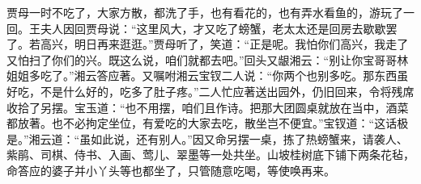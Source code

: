 \begin{parag}


    贾母一时不吃了，大家方散，都洗了手，也有看花的，也有弄水看鱼的，游玩了一回。王夫人因回贾母说：“这里风大，才又吃了螃蟹，老太太还是回房去歇歇罢了。若高兴，明日再来逛逛。”贾母听了，笑道：“正是呢。我怕你们高兴，我走了又怕扫了你们的兴。既这么说，咱们就都去吧。”回头又龈湘云：“别让你宝哥哥林姐姐多吃了。”湘云答应著。又嘱咐湘云宝钗二人说：“你两个也别多吃。那东西虽好吃，不是什么好的，吃多了肚子疼。”二人忙应著送出园外，仍旧回来，令将残席收拾了另摆。宝玉道：“也不用摆，咱们且作诗。把那大团圆桌就放在当中，酒菜都放著。也不必拘定坐位，有爱吃的大家去吃，散坐岂不便宜。”宝钗道：“这话极是。”湘云道：“虽如此说，还有别人。”因又命另摆一桌，拣了热螃蟹来，请袭人、紫鹃、司棋、侍书、入画、莺儿、翠墨等一处共坐。山坡桂树底下铺下两条花毡，命答应的婆子并小丫头等也都坐了，只管随意吃喝，等使唤再来。
\end{parag}


